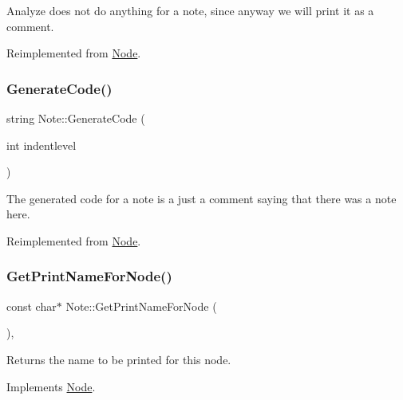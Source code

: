 Analyze does not do anything for a note, since anyway we will print it as a comment. 

Reimplemented from \hyperlink{class_node_a5f88d55c6f253a29def7ccc443d83d47}{Node}.

\mbox{\label{class_note_a1d4dec4a419c305cfb19376230365dc1}} 
\subsubsection{\texorpdfstring{Generate\+Code()}{GenerateCode()}}
{\footnotesize\ttfamily string Note\+::\+Generate\+Code (\begin{DoxyParamCaption}\item[{int}]{indentlevel }\end{DoxyParamCaption})\hspace{0.3cm}{\ttfamily [virtual]}}

The generated code for a note is a just a comment saying that there was a note here. 

Reimplemented from \hyperlink{class_node_acb60e526730e8436056375a3055c2c32}{Node}.

\mbox{\label{class_note_ae38717d9af17947262aa3f4a1d473363}} 
\subsubsection{\texorpdfstring{Get\+Print\+Name\+For\+Node()}{GetPrintNameForNode()}}
{\footnotesize\ttfamily const char$\ast$ Note\+::\+Get\+Print\+Name\+For\+Node (\begin{DoxyParamCaption}{ }\end{DoxyParamCaption})\hspace{0.3cm}{\ttfamily [inline]}, {\ttfamily [virtual]}}

Returns the name to be printed for this node. 

Implements \hyperlink{class_node_a56e29657306ffb004d69c6929ae44269}{Node}.

\mbox{\label{class_note_ae922da0a006d207db5e141dcade6032e}} 
